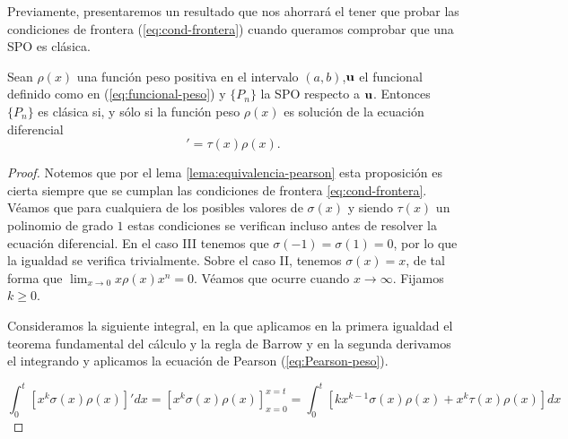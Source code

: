 Previamente, presentaremos un resultado que nos ahorrará el tener que probar las condiciones de frontera (\ref{eq:cond-frontera}) cuando queramos comprobar que una SPO es clásica.

\begin{proposicion}
    Sean $\rho(x)$ una función peso positiva en el intervalo $(a,b)$,$\mathbf{u}$ el funcional definido como en (\ref{eq:funcional-peso}) y $\{P_n\}$ la SPO respecto a $\mathbf{u}$. Entonces $\{P_n\}$ es clásica si, y sólo si la función peso $\rho(x)$ es solución de la ecuación diferencial
    \begin{equation*}
        [\sigma(x)\rho(x)]'=\tau(x)\rho(x).
    \end{equation*}
\end{proposicion}
\begin{proof}
    Notemos que por el lema \ref{lema:equivalencia-pearson} esta proposición es cierta siempre que se cumplan las condiciones de frontera \ref{eq:cond-frontera}. Véamos que para cualquiera de los posibles valores de $\sigma(x)$ y siendo $\tau(x)$ un polinomio de grado $1$ estas condiciones se verifican incluso antes de resolver la ecuación diferencial. En el caso III tenemos que $\sigma(-1)=\sigma(1)=0$, por lo que la igualdad se verifica trivialmente.
    Sobre el caso II, tenemos $\sigma(x)=x$, de tal forma que $\displaystyle\lim_{x\rightarrow 0} x\rho(x)x^n = 0$. Véamos que ocurre cuando $x\rightarrow\infty$. Fijamos $k\geq 0$. 

    Consideramos la siguiente integral, en la que aplicamos en la primera igualdad el teorema fundamental del cálculo y la regla de Barrow y en la segunda derivamos el integrando y aplicamos la ecuación de Pearson (\ref{eq:Pearson-peso}).

    \begin{equation*}
            \int_0^t [x^k\sigma(x)\rho(x)]'dx = \left[x^k\sigma(x)\rho(x)\right]_{x=0}^{x=t} = \int_0^t[kx^{k-1}\sigma(x)\rho(x)+x^k\tau(x)\rho(x)]dx
    \end{equation*}


\end{proof}
